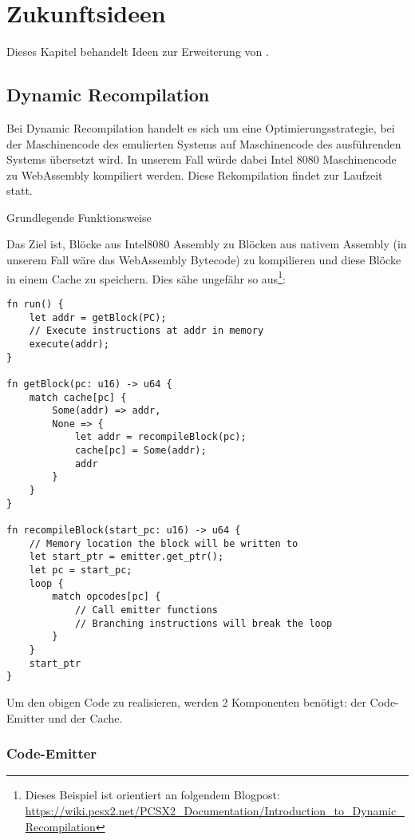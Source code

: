 \chapter{Zukunftsideen}

Dieses Kapitel behandelt Ideen zur Erweiterung von \Emu.

\section{Dynamic Recompilation}

Bei Dynamic Recompilation handelt es sich um eine Optimierungsstrategie, bei der Maschinencode des emulierten Systems auf Maschinencode des ausführenden Systems übersetzt wird. In unserem Fall würde dabei Intel 8080 Maschinencode zu WebAssembly kompiliert werden. Diese Rekompilation findet zur Laufzeit statt.

Grundlegende Funktionsweise

Das Ziel ist, Blöcke aus Intel8080 Assembly zu Blöcken aus nativem Assembly (in unserem Fall wäre das WebAssembly Bytecode) zu kompilieren und diese Blöcke in einem Cache zu speichern. Dies sähe ungefähr so aus\footnote{Dieses Beispiel ist orientiert an folgendem Blogpost: \url{https://wiki.pcsx2.net/PCSX2_Documentation/Introduction_to_Dynamic_Recompilation}}:


\begin{verbatim}
fn run() {
    let addr = getBlock(PC);
    // Execute instructions at addr in memory
    execute(addr);
}

fn getBlock(pc: u16) -> u64 {
    match cache[pc] {
        Some(addr) => addr,
        None => {
            let addr = recompileBlock(pc);
            cache[pc] = Some(addr);
            addr
        }
    }
}

fn recompileBlock(start_pc: u16) -> u64 {
    // Memory location the block will be written to
    let start_ptr = emitter.get_ptr();
    let pc = start_pc;
    loop {
        match opcodes[pc] {
            // Call emitter functions
            // Branching instructions will break the loop
        }
    }
    start_ptr
}
\end{verbatim}

Um den obigen Code zu realisieren, werden 2 Komponenten benötigt: der Code-Emitter und der Cache.

\subsection{Code-Emitter}

